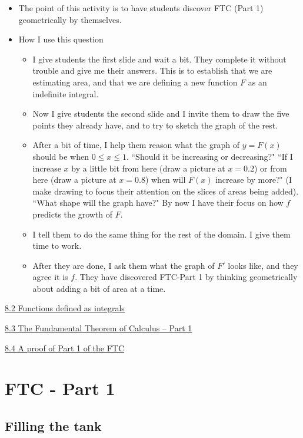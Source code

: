 \documentclass[11pt]{article}
\newcommand{\nl}{\hfill \vspace{-1.1\baselineskip}} %
\newcommand{\vii}{\hspace{8mm} \href{https://www.youtube.com/watch?v=BQIiCjoFILs&list=PLlwePzQY_wW_8-sITAbG_GU2JgiuwXkDN&index=2}{8.2 Functions defined as integrals}}
\newcommand{\viii}{\hspace{8mm} \href{https://www.youtube.com/watch?v=JeKCipoy8bc&list=PLlwePzQY_wW_8-sITAbG_GU2JgiuwXkDN&index=3}{8.3 The Fundamental Theorem of Calculus -- Part 1}}
\newcommand{\viv}{\hspace{8mm} \href{https://www.youtube.com/watch?v=UZmMgSIgi3k&list=PLlwePzQY_wW_8-sITAbG_GU2JgiuwXkDN&index=4}{8.4 A proof of Part 1 of the FTC}}
\begin{document}
\begin{comments}
\nl
	\begin{itemize}
		\item The point of this activity is to have students discover FTC (Part 1) geometrically by themselves.  
		\item How I use this question
			\begin{itemize}
				\item   I give students the first slide and wait a bit.  They complete it without trouble and give me their answers.  This is to establish that we are estimating area, and that we are defining a new function $F$ as an indefinite integral.
				\item  Now I give students the second slide and I invite them to draw the five points they already have, and to try to sketch the graph of the rest.
				\item  After a bit of time, I help them reason what the graph of $y=F(x)$ should be when $0\leq x \leq 1$.   ``Should it be increasing or decreasing?"  ``If I increase $x$ by a little bit from here (draw a picture at $x=0.2$) or from here (draw a picture at $x=0.8$) when will $F(x)$ increase by more?"  (I make drawing to focus their attention on the slices of areas being added).  ``What shape will the graph have?"   By now I have their focus on how $f$ predicts the growth of $F$.   
				\item I tell them to do the same thing for the rest of the domain. I give them time to work.
				\item After they are done, I ask them what the graph of $F'$ looks like, and they agree it is $f$.    They have discovered FTC-Part 1 by thinking geometrically about adding a bit of area at a time.
			\end{itemize}
	\end{itemize}
\end{comments}

\begin{videos}
\vii

\viii

\viv
\end{videos}

\newpage
\section{FTC - Part 1}
\subsection{Filling the tank}
\end{document}
